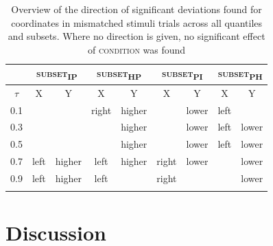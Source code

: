 \begin{table}\fontsize{10}{11}
\caption{Overview of the direction of significant deviations found for coordinates in mismatched stimuli trials across all quantiles and subsets. Where no direction is given, no significant effect of \textsc{condition} was found}
\label{tab:8.10}
\centering
\begin{tabular}{ccccccccc}
\lsptoprule
\multirow{2}{*}{~} & 
\multicolumn{2}{c}{\textsc{subset\textsubscript{IP}}} & 
\multicolumn{2}{c}{\textsc{subset\textsubscript{HP}}} & 
\multicolumn{2}{c}{\textsc{subset\textsubscript{PI}}} & 
\multicolumn{2}{c}{\textsc{subset\textsubscript{PH}}}  \\
\midrule
                                   $\tau$    & X    & Y                     & X     & Y                    & X     & Y                    & X    & Y                      \\
                                       \midrule
0.1                                    & ~    & ~                     & right & higher               & ~     & lower                & left & ~                      \\
0.3                                    & ~    & ~                     & ~     & higher               & ~     & lower                & left & lower                  \\
0.5                                    & ~    & ~                     & ~     & higher               & ~     & lower                & left & lower                  \\
0.7                                    & left & higher                & left  & higher               & right & lower                & ~    & lower                  \\
0.9                                    & left & higher                & left  & ~                    & right & ~                    & ~    & lower     \\
\lspbottomrule
\end{tabular}
\end{table}

\section{Discussion}\label{section08_3}

